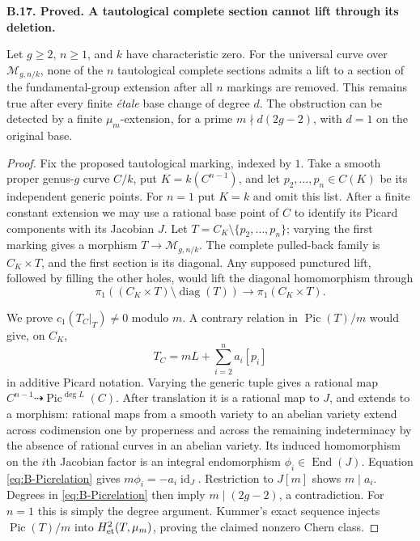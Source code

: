 \documentclass[11pt,oneside]{article}
\makeatletter
\newcounter{statementanchor}
\newenvironment{statement}[3]{%
 \refstepcounter{statementanchor}\def\@currentlabel{#1}%
 \par\addvspace{9pt}\noindent
 \textbf{#1. #2. #3.}\par\nobreak\noindent\ignorespaces
}{\par\addvspace{5pt}}
\makeatother
\begin{document}
\begin{statement}{B.17}{Proved}{A tautological complete section cannot lift through its deletion}
\label{st:B.17}

Let $g\geq2$, $n\geq1$, and $k$ have characteristic zero.  For the
universal curve over $\mathcal M_{g,n/k}$, none of the $n$ tautological
complete sections admits a lift to a section of the fundamental-group
extension after all $n$ markings are removed.  This remains true
after every finite \emph{\'etale} base change of degree $d$.
The obstruction can be detected by a finite $\mu_m$-extension,
for a prime $m\nmid d(2g-2)$, with $d=1$ on the original base.
\end{statement}
\begin{proof}
Fix the proposed tautological marking, indexed by $1$.  Take a smooth
proper genus-$g$ curve $C/k$, put
$K=k(C^{n-1})$, and let $p_2,\ldots,p_n\in C(K)$ be its independent
generic points.  For $n=1$ put $K=k$ and omit this list.  After a
finite constant extension we may use a rational base point of $C$
to identify its Picard components with its Jacobian $J$.
Let $T=C_K\setminus\{p_2,\ldots,p_n\}$; varying the first marking
gives a morphism $T\to\mathcal M_{g,n/k}$.  The complete pulled-back
family is $C_K\times T$, and the first section is its diagonal.
Any supposed punctured lift, followed by filling the other holes,
would lift the diagonal homomorphism through
\[
 \pi_1((C_K\times T)\setminus\operatorname{diag}(T))
 \longrightarrow\pi_1(C_K\times T).
\]

We prove $c_1(T_C|_T)\ne0$ modulo $m$.  A contrary relation in
$\operatorname{Pic}(T)/m$ would give, on $C_K$,
\[
 T_C=mL+\sum_{i=2}^n a_i[p_i]
 \tag{B.1}\label{eq:B-Picrelation}
\]
in additive Picard notation.  Varying the generic tuple gives a
rational map $C^{n-1}\dashrightarrow\operatorname{Pic}^{\deg L}(C)$.
After translation it is a rational map to $J$, and extends to a
morphism: rational maps from a smooth variety to an abelian variety
extend across codimension one by properness and across the remaining
indeterminacy by the absence of rational curves in an abelian variety.
Its induced homomorphism on the $i$th Jacobian factor is an integral
endomorphism $\phi_i\in\operatorname{End}(J)$.
Equation \eqref{eq:B-Picrelation} gives
$m\phi_i=-a_i\operatorname{id}_J$.  Restriction to $J[m]$ shows
$m\mid a_i$.  Degrees in \eqref{eq:B-Picrelation} then imply
$m\mid(2g-2)$, a contradiction.  For $n=1$ this is simply the degree
argument.  Kummer's exact sequence injects
$\operatorname{Pic}(T)/m$ into $H^2_{\rm et}(T,\mu_m)$, proving the
claimed nonzero Chern class.


\end{proof}
\end{document}
